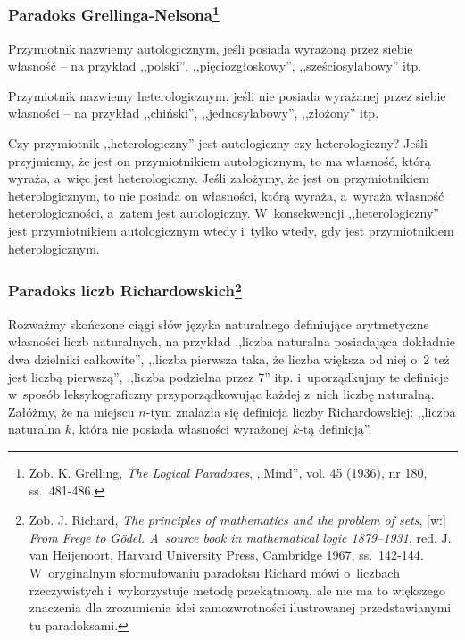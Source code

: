 \subsubsection[Paradoks Grellinga-Nelsona]{Paradoks Grellinga-Nelsona\footnote{Zob. K. Grelling, \textit{The Logical Paradoxes}, ,,Mind'', vol. 45 (1936), nr 180, ss.~481-486.}}


Przymiotnik nazwiemy autologicznym, jeśli posiada wyrażoną przez siebie własność -- na przykład ,,polski'', ,,pięciozgłoskowy'', ,,sześciosylabowy'' itp.

Przymiotnik nazwiemy heterologicznym, jeśli nie posiada wyrażanej przez siebie własności -- na przykład ,,chiński'', ,,jednosylabowy'', ,,złożony'' itp.

Czy przymiotnik ,,heterologiczny'' jest autologiczny czy heterologiczny? Jeśli przyjmiemy, że jest on przymiotnikiem autologicznym, to ma własność, którą wyraża, a~więc jest heterologiczny. Jeśli założymy, że jest on przymiotnikiem heterologicznym, to nie posiada on własności, którą wyraża, a~wyraża własność heterologiczności, a~zatem jest autologiczny. W~konsekwencji ,,heterologiczny'' jest przymiotnikiem autologicznym wtedy i~tylko wtedy, gdy jest przymiotnikiem heterologicznym.


\subsubsection[Paradoks liczb Richardowskich]{Paradoks liczb Richardowskich\footnote{Zob. J. Richard, \textit{The principles of mathematics and the problem of sets}, [w:] \textit{From Frege to Gödel. A~source book in mathematical logic 1879–1931}, red. J. van Heijenoort, Harvard University Press, Cambridge 1967, ss.~142-144. W~oryginalnym sformułowaniu paradoksu Richard mówi o~liczbach rzeczywistych i~wykorzystuje metodę przekątniową, ale nie ma to większego znaczenia dla zrozumienia idei zamozwrotności ilustrowanej przedstawianymi tu paradoksami.}}


Rozważmy skończone ciągi słów języka naturalnego definiujące arytmetyczne własności liczb naturalnych, na przykład ,,liczba naturalna posiadająca dokładnie dwa dzielniki całkowite'', ,,liczba pierwsza taka, że liczba większa od niej o~2 też jest liczbą pierwszą'', ,,liczba podzielna przez 7'' itp. i~uporządkujmy te definicje w~sposób leksykograficzny przyporządkowując każdej z~nich liczbę naturalną. Załóżmy, że na miejscu $n$-tym znalazła się definicja liczby Richardowskiej: ,,liczba naturalna $k$, która nie posiada własności wyrażonej $k$-tą definicją''.

